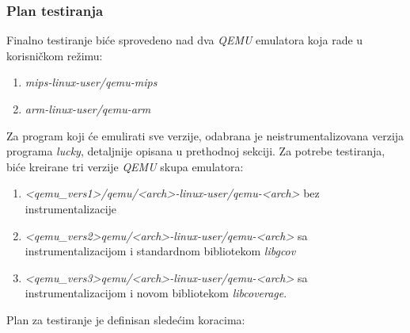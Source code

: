 \documentclass[12pt,oneside]{memoir}
\newcommand{\strano}[1]{\textit{#1}}
\begin{document}
\subsubsection{Plan testiranja}

Finalno testiranje biće sprovedeno nad dva \strano{QEMU} emulatora koja rade u korisničkom režimu:
\begin{enumerate}
\item \strano{mips-linux-user/qemu-mips}
\item \strano{arm-linux-user/qemu-arm}
\end{enumerate}
Za program koji će emulirati sve verzije, odabrana je neistrumentalizovana verzija programa \strano{lucky}, detaljnije opisana u prethodnoj sekciji.
Za potrebe testiranja, biće kreirane tri verzije \strano{QEMU} skupa emulatora:
\begin{enumerate}
\item \strano{<qemu\_vers1>/qemu/<arch>-linux-user/qemu-<arch>} bez instrumentalizacije
\item \strano{<qemu\_vers2>qemu/<arch>-linux-user/qemu-<arch>} sa instrumentalizacijom i standardnom bibliotekom \strano{libgcov}
\item \strano{<qemu\_vers3>qemu/<arch>-linux-user/qemu-<arch>} sa instrumentalizacijom i novom bibliotekom \strano{libcoverage}.
\end{enumerate}
Plan za testiranje je definisan sledećim koracima:
\end{document}
